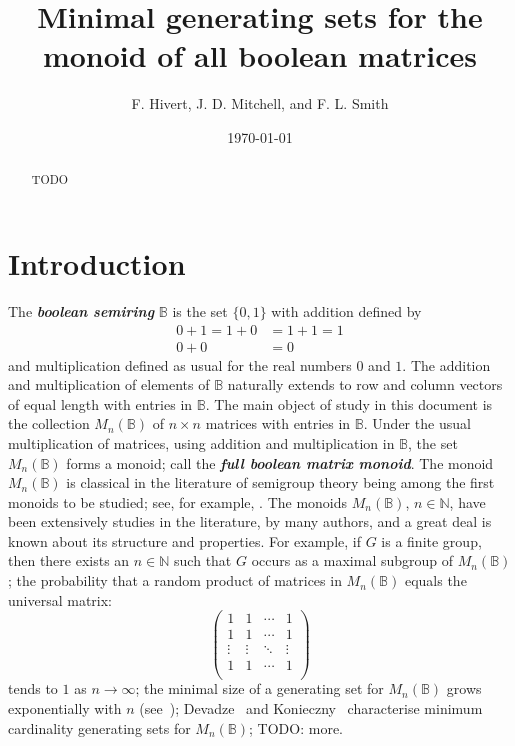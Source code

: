 \documentclass[11pt]{article}
\title{Minimal generating sets for the monoid of all boolean matrices}
\author{F. Hivert, J. D. Mitchell, and F. L. Smith}
\date{\today}
\newcommand{\defn}[1]{\textbf{\textit{#1}}}
\numberwithin{equation}{section}
\renewcommand{\to}{\longrightarrow}
\newcommand{\B}{\mathbb{B}}
\newcommand{\Bn}{M_n(\B)}
\newcommand{\N}{\mathbb{N}}
\begin{document}
\maketitle

\begin{abstract}
  TODO
\end{abstract}

\section{Introduction}


The \defn{boolean semiring} $\B$ is the set $\{0, 1\}$ with addition defined by 
\begin{align*}
  0 + 1 = 1 + 0 &= 1 + 1 = 1 \\
  0 + 0 &= 0
\end{align*}
and multiplication defined as usual for the real numbers $0$ and $1$.  The
addition and multiplication of elements of $\B$ naturally extends to row and
column vectors of equal length with entries in $\B$.  The main object of study
in this document is the collection $\Bn$ of $n\times n$ matrices with entries
in $\B$. Under the usual multiplication of matrices, using addition and
multiplication in $\B$, the set $\Bn$ forms a monoid; call the \defn{full
boolean matrix monoid}. The monoid $\Bn$ is classical in the literature of
semigroup theory being among the first monoids to be studied; see, for example,
\cite{}. The monoids $\Bn$, $n\in \N$, have been extensively studies in the
literature, by many authors, and a great deal is known about its structure and
properties. For example, if $G$ is a finite group, then there exists an $n\in
\N$ such that $G$ occurs as a maximal subgroup of $\Bn$; the probability that a
random product of matrices in $\Bn$ equals the universal matrix:
\begin{equation*} 
  \begin{pmatrix}
  1 & 1 & \cdots & 1\\
  1 & 1 & \cdots & 1\\ 
  \vdots & \vdots & \ddots & \vdots\\
  1 & 1 & \cdots & 1\\ 
\end{pmatrix} 
\end{equation*} 
tends to $1$ as $n\to \infty$; the minimal size of a generating set for $\Bn$
grows exponentially with $n$ (see~);
Devadze~\cite{Devadze1968aa} and Konieczny~\cite{Konieczny2011aa} characterise
minimum cardinality generating sets for $\Bn$; TODO: more.
\end{document}
